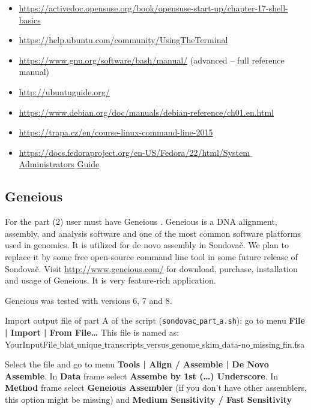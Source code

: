 \documentclass[a4paper, 11pt, twoside]{article}
\begin{document}
\begin{itemize}
\item \href{https://activedoc.opensuse.org/book/opensuse-start-up/chapter-17-shell-basics}{https://activedoc.opensuse.org/book/opensuse-start-up/chapter-17-shell-basics}
\item \href{https://help.ubuntu.com/community/UsingTheTerminal}{https://help.ubuntu.com/community/UsingTheTerminal}
\item \href{https://www.gnu.org/software/bash/manual/}{https://www.gnu.org/software/bash/manual/} (advanced -- full reference manual)
\item \href{http://ubuntuguide.org/}{http://ubuntuguide.org/}
\item \href{https://www.debian.org/doc/manuals/debian-reference/ch01.en.html}{https://www.debian.org/doc/manuals/debian-reference/ch01.en.html}
\item \href{https://trapa.cz/en/course-linux-command-line-2015}{https://trapa.cz/en/course-linux-command-line-2015}
\item \href{https://docs.fedoraproject.org/en-US/Fedora/22/html/System_Administrators_Guide}{https://docs.fedoraproject.org/en-US/Fedora/22/html/System$\_$Administrators$\_$Guide}
\end{itemize}

\subsection{Geneious}
\label{geneious}

For the part (2) user must have Geneious \citep{Meintjes2012}. Geneious is a DNA alignment, assembly, and analysis software and one of the most common software platforms used in genomics. It is utilized for de novo assembly in Sondovač. We plan to replace it by some free open-source command line tool in some future release of Sondovač. Visit \href{http://www.geneious.com/}{http://www.geneious.com/} for download, purchase, installation and usage of Geneious. It is very feature-rich application.

Geneious was tested with versions 6, 7 and 8.

Import output file of part A of the script (\texttt{sondovac$\_$part$\_$a.sh}): go to menu \textbf{File | Import | From File\ldots} This file is named as:\\YourInputFile$\_$blat$\_$unique$\_$transcripts$\_$versus$\_$genome$\_$skim$\_$data-no$\_$missing$\_$fin.fsa

Select the file and go to menu \textbf{Tools | Align / Assemble | De Novo Assemble}. In \textbf{Data} frame select \textbf{Assembe by 1st (\ldots) Underscore}. In \textbf{Method} frame select \textbf{Geneious Assembler} (if you don't have other assemblers, this option might be missing) and \textbf{Medium Sensitivity / Fast Sensitivity}
\end{document}

